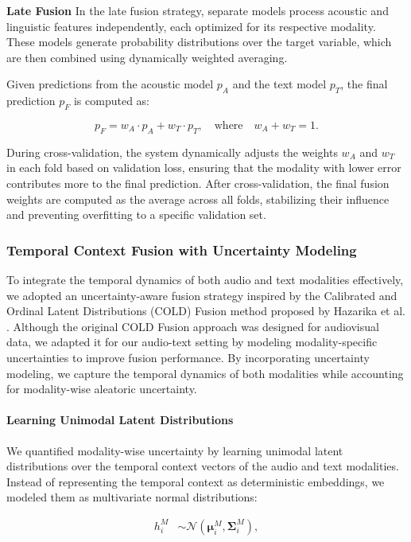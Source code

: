 \documentclass[9pt,a4paper]{rho-class/rho}
\begin{document}
\textbf{Late Fusion} In the late fusion strategy, separate models process acoustic and linguistic features independently, each optimized for its respective modality. These models generate probability distributions over the target variable, which are then combined using dynamically weighted averaging.

Given predictions from the acoustic model \( p_A \) and the text model \( p_T \), the final prediction \( p_F \) is computed as:

\[
p_F = w_A \cdot p_A + w_T \cdot p_T, \quad \text{where} \quad w_A + w_T = 1.
\]

During cross-validation, the system dynamically adjusts the weights \( w_A \) and \( w_T \) in each fold based on validation loss, ensuring that the modality with lower error contributes more to the final prediction. After cross-validation, the final fusion weights are computed as the average across all folds, stabilizing their influence and preventing overfitting to a specific validation set. 


\subsubsection{Temporal Context Fusion with Uncertainty Modeling} 

To integrate the temporal dynamics of both audio and text modalities effectively, we adopted an uncertainty-aware fusion strategy inspired by the Calibrated and Ordinal Latent Distributions (COLD) Fusion method proposed by Hazarika et al. \cite{hazarika2020misa, tellamekala2023cold}. Although the original COLD Fusion approach was designed for audiovisual data, we adapted it for our audio-text setting by modeling modality-specific uncertainties to improve fusion performance. By incorporating uncertainty modeling, we capture the temporal dynamics of both modalities while accounting for modality-wise aleatoric uncertainty.

\paragraph{Learning Unimodal Latent Distributions}

We quantified modality-wise uncertainty by learning unimodal latent distributions over the temporal context vectors of the audio and text modalities. Instead of representing the temporal context as deterministic embeddings, we modeled them as multivariate normal distributions:

\begin{align*}
h_i^M &\sim \mathcal{N}(\boldsymbol{\mu}_i^M, \boldsymbol{\Sigma}_i^M),
\end{align*}
\end{document}
